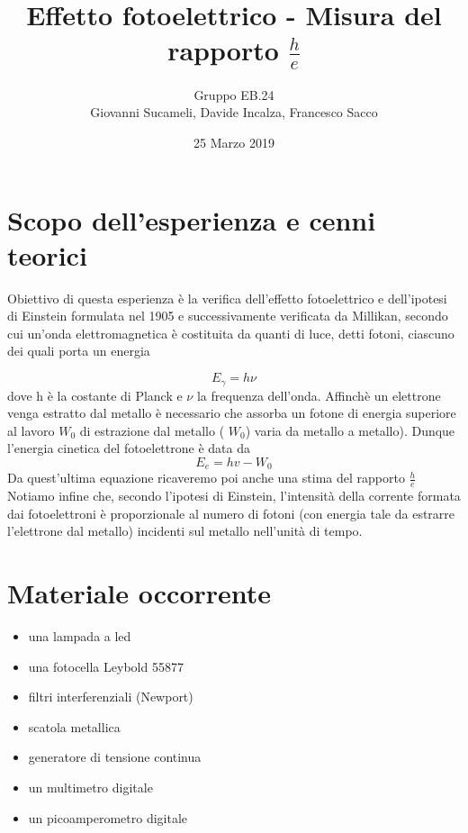 \documentclass[10pt,a4paper]{article}
\author{Gruppo EB.24 \\Giovanni Sucameli, Davide Incalza, Francesco Sacco}
\title{Effetto fotoelettrico - Misura del rapporto $\frac{h}{e}$}
\begin{document}
\date{25 Marzo 2019}
\maketitle
\section*{Scopo dell'esperienza e cenni teorici}
Obiettivo di questa esperienza è la verifica dell'effetto fotoelettrico e dell'ipotesi di Einstein formulata nel 1905 e successivamente verificata da Millikan, secondo cui un'onda elettromagnetica è costituita da quanti di luce, detti fotoni, ciascuno dei quali porta un energia 

\begin{equation}
E_{\gamma} = h\nu
\label{energia}
\end{equation}
dove h è la costante di Planck e $ \nu $ la frequenza dell'onda. Affinchè un elettrone venga estratto dal metallo è necessario che assorba un fotone di energia superiore al lavoro $ W_{0}$ di estrazione dal metallo ( $ W_{0} $)  varia da metallo a metallo). Dunque l'energia cinetica del fotoelettrone è data da
\begin{equation}
    E_{e} = hv - W_{0}
\label{foto}
\end{equation}
Da quest'ultima equazione ricaveremo poi anche una stima del rapporto $ \frac{h}{e} $
Notiamo infine che, secondo l'ipotesi di Einstein, l'intensità della corrente formata dai fotoelettroni è proporzionale al numero di fotoni (con energia tale da estrarre l'elettrone dal metallo) incidenti sul metallo nell'unità di tempo.

\section*{Materiale occorrente}

\begin{itemize}
\item una lampada a led
\item una fotocella Leybold 55877 
\item filtri interferenziali (Newport)
\item scatola metallica
\item generatore di tensione continua
\item un multimetro digitale
\item un picoamperometro digitale
\end{itemize}
\end{document}
